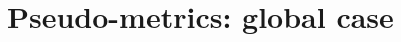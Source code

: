 \documentclass [11pt,reqno]{amsart}
\def\bP{{\mathbb{P}}}
\newcommand{\1}{\mathmybb{1}}
\def\cL{{\mathcal{L}}}
\def\div{\operatorname{div}}
\newcommand{\hlocale}[6]{#1_{#2,...,#3}^{#4,...,#5}(#6)}
\begin{document}

\section{Pseudo-metrics: global case}
\label{sec:pseudo-metric families}
\end{document}
